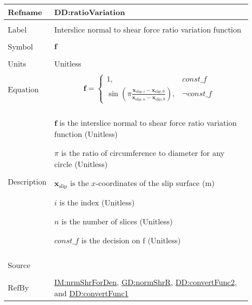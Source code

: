 \documentclass[12pt]{article}
\begin{document}
\vspace{\baselineskip}
\noindent
\begin{minipage}{\textwidth}
\begin{tabular}{>{\raggedright}p{}>{\raggedright\arraybackslash}p{}}
\toprule \textbf{Refname} & \textbf{DD:ratioVariation}
\label{DD:ratioVariation}
\\ \midrule \\
Label & Interslice normal to shear force ratio variation function
        
\\ \midrule \\
Symbol & $\symbf{f}$
         
\\ \midrule \\
Units & Unitless
        
\\ \midrule \\
Equation & \begin{displaymath}
           \symbf{f}=\begin{cases}
                     1, & \mathit{const\_f}\\
                     \sin\left(π \frac{{\symbf{x}_{\text{slip},i}}-{\symbf{x}_{\text{slip},0}}}{{\symbf{x}_{\text{slip},n}}-{\symbf{x}_{\text{slip},0}}}\right), & \neg{}\mathit{const\_f}
                     \end{cases}
           \end{displaymath}
\\ \midrule \\
Description & \begin{symbDescription}
              \item{$\symbf{f}$ is the interslice normal to shear force ratio variation function (Unitless)}
              \item{$π$ is the ratio of circumference to diameter for any circle (Unitless)}
              \item{${\symbf{x}_{\text{slip}}}$ is the $x$-coordinates of the slip surface (${\text{m}}$)}
              \item{$i$ is the index (Unitless)}
              \item{$n$ is the number of slices (Unitless)}
              \item{$\mathit{const\_f}$ is the decision on f (Unitless)}
              \end{symbDescription}
\\ \midrule \\
Source & \cite{fredlund1977}
         
\\ \midrule \\
RefBy & \hyperref[IM:nrmShrForDen]{IM:nrmShrForDen}, \hyperref[GD:normShrR]{GD:normShrR}, \hyperref[DD:convertFunc2]{DD:convertFunc2}, and \hyperref[DD:convertFunc1]{DD:convertFunc1}
        
\\ \bottomrule
\end{tabular}
\end{minipage}
\end{document}
